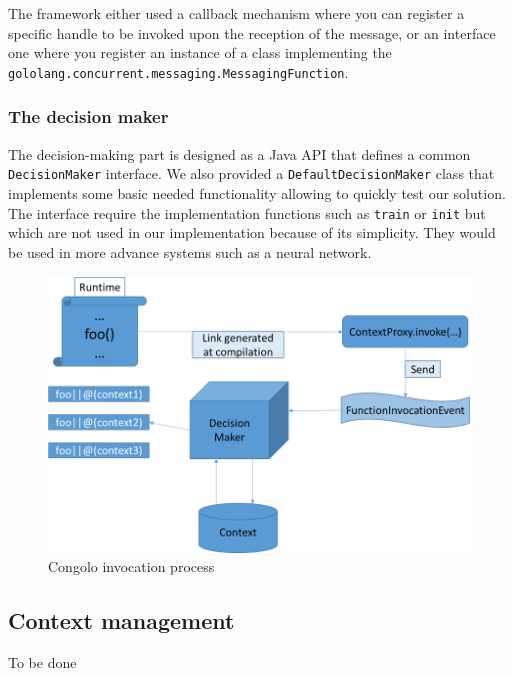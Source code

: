 \documentclass[a4paper]{article}
\begin{document}
The framework either used a callback mechanism where you can register a specific handle to be invoked upon the reception of the message, or an interface one where you register an instance of a class implementing the \lstinline|gololang.concurrent.messaging.MessagingFunction|.

\subsubsection{The decision maker}
The decision-making part is designed as a Java API that defines a common \lstinline|DecisionMaker| interface. We also provided a \lstinline|DefaultDecisionMaker| class that implements some basic needed functionality allowing to quickly test our solution. The interface require the implementation functions such as \lstinline|train| or \lstinline|init| but which are not used in our implementation because of its simplicity. They would be used in more advance systems such as a neural network. 

\begin{center}
\begin{figure}
\centering
\includegraphics[width=0.9\columnwidth]{images/contextual_invocation.png}
\caption{Congolo invocation process}
\label{figure:congoloinvoke}
\end{figure}
\end{center}

\subsection{Context management}
To be done
\end{document}
